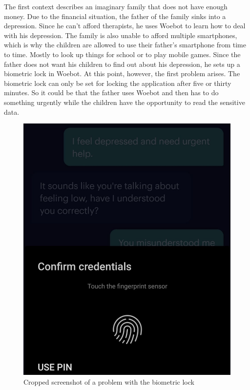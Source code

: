 The first context describes an imaginary family that does not have enough money.
Due to the financial situation, the father of the family sinks into a depression.
Since he can't afford therapists, he uses Woebot to learn how to deal with his depression.
The family is also unable to afford multiple smartphones, which is why the children are allowed to use their father's smartphone from time to time.
Mostly to look up things for school or to play mobile games.
Since the father does not want his children to find out about his depression, he sets up a biometric lock in Woebot.
At this point, however, the first problem arises.
The biometric lock can only be set for locking the application after five or thirty minutes.
So it could be that the father uses Woebot and then has to do something urgently while the children have the opportunity to read the sensitive data.\\

\begin{figure}[ht]
    \begin{center}
        \includegraphics[width=1\columnwidth]{files/biometric-lock.png}
        \caption{\label{fig:biometric-lock} Cropped screenshot of a problem with the biometric lock}
    \end{center}
\end{figure}

